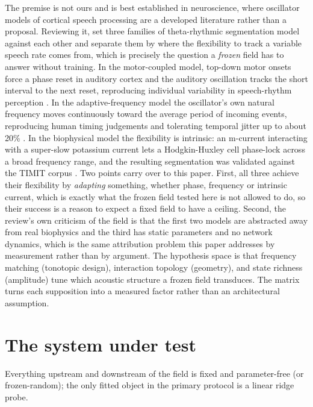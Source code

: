 \documentclass[10pt]{article}
\makeatletter
\newcommand{\tmlr@floatbarrier}{\par\vspace{\z@}%
  \ifx\@deferlist\@empty\else\clearpage\fi}
\let\tmlr@section\section
\renewcommand{\section}{\tmlr@floatbarrier\tmlr@section}
\makeatother
\begin{document}
The premise is not ours and is best established in neuroscience, where
oscillator models of cortical speech processing are a developed
literature rather than a proposal. Reviewing it, \citep{dogonasheva2026}
set three families of theta-rhythmic segmentation model against each
other and separate them by where the flexibility to track a variable
speech rate comes from, which is precisely the question a \emph{frozen}
field has to answer without training. In the motor-coupled model,
top-down motor onsets force a phase reset in auditory cortex and the
auditory oscillation tracks the short interval to the next reset,
reproducing individual variability in speech-rhythm perception
\citep{assaneo2020}. In the adaptive-frequency model the oscillator's
own natural frequency moves continuously toward the average period of
incoming events, reproducing human timing judgements and tolerating
temporal jitter up to about 20\% \citep{doelling2023}. In the
biophysical model the flexibility is intrinsic: an m-current interacting
with a super-slow potassium current lets a Hodgkin-Huxley cell
phase-lock across a broad frequency range, and the resulting
segmentation was validated against the TIMIT corpus
\citep{pittman-polletta2021}. Two points carry over to this paper.
First, all three achieve their flexibility by \emph{adapting} something,
whether phase, frequency or intrinsic current, which is exactly what the
frozen field tested here is not allowed to do, so their success is a
reason to expect a fixed field to have a ceiling. Second, the review's
own criticism of the field is that the first two models are abstracted
away from real biophysics and the third has static parameters and no
network dynamics, which is the same attribution problem this paper
addresses by measurement rather than by argument. The hypothesis space
is that frequency matching (tonotopic design), interaction topology
(geometry), and state richness (amplitude) tune which acoustic structure
a frozen field transduces. The matrix turns each supposition into a
measured factor rather than an architectural assumption.

\section{The system under test}\label{the-system-under-test}

Everything upstream and downstream of the field is fixed and
parameter-free (or frozen-random); the only fitted object in the primary
protocol is a linear ridge probe.
\end{document}

